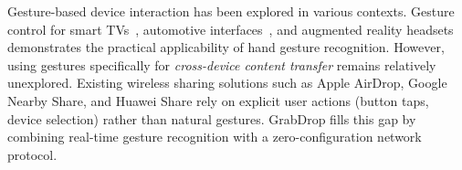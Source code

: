 Gesture-based device interaction has been explored in various contexts.
Gesture control for smart TVs~\cite{samsung2013gesture}, automotive
interfaces~\cite{ohn2014hand}, and augmented reality
headsets~\cite{meta2023hand} demonstrates the practical applicability
of hand gesture recognition. However, using gestures specifically for
\emph{cross-device content transfer} remains relatively unexplored.
Existing wireless sharing solutions such as Apple AirDrop, Google Nearby
Share, and Huawei Share rely on explicit user actions (button taps,
device selection) rather than natural gestures. GrabDrop fills this gap
by combining real-time gesture recognition with a zero-configuration
network protocol.

